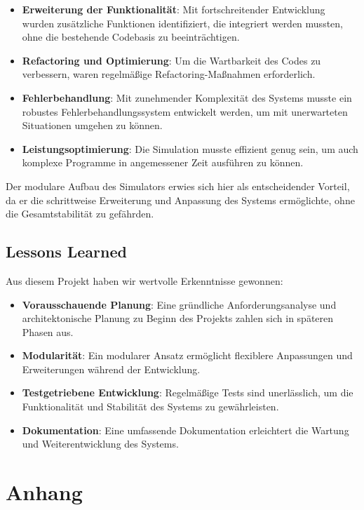 \documentclass[a4paper,11pt]{report}
\begin{document}
\begin{itemize}
    \item \textbf{Erweiterung der Funktionalität}: Mit fortschreitender Entwicklung wurden zusätzliche Funktionen identifiziert, die integriert werden mussten, ohne die bestehende Codebasis zu beeinträchtigen.
    \item \textbf{Refactoring und Optimierung}: Um die Wartbarkeit des Codes zu verbessern, waren regelmäßige Refactoring-Maßnahmen erforderlich.
    \item \textbf{Fehlerbehandlung}: Mit zunehmender Komplexität des Systems musste ein robustes Fehlerbehandlungssystem entwickelt werden, um mit unerwarteten Situationen umgehen zu können.
    \item \textbf{Leistungsoptimierung}: Die Simulation musste effizient genug sein, um auch komplexe Programme in angemessener Zeit ausführen zu können.
\end{itemize}

Der modulare Aufbau des Simulators erwies sich hier als entscheidender Vorteil, da er die schrittweise Erweiterung und Anpassung des Systems ermöglichte, ohne die Gesamtstabilität zu gefährden.

\section{Lessons Learned}

Aus diesem Projekt haben wir wertvolle Erkenntnisse gewonnen:

\begin{itemize}
    \item \textbf{Vorausschauende Planung}: Eine gründliche Anforderungsanalyse und architektonische Planung zu Beginn des Projekts zahlen sich in späteren Phasen aus.
    \item \textbf{Modularität}: Ein modularer Ansatz ermöglicht flexiblere Anpassungen und Erweiterungen während der Entwicklung.
    \item \textbf{Testgetriebene Entwicklung}: Regelmäßige Tests sind unerlässlich, um die Funktionalität und Stabilität des Systems zu gewährleisten.
    \item \textbf{Dokumentation}: Eine umfassende Dokumentation erleichtert die Wartung und Weiterentwicklung des Systems.
\end{itemize}





\appendix
\chapter{Anhang} 
\end{document}
